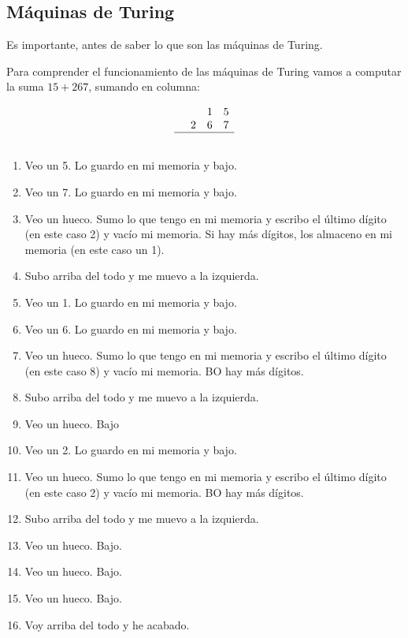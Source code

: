 
\subsection{Máquinas de Turing}

Es importante, antes de saber lo que son las máquinas de Turing.

\begin{example}
Para comprender el funcionamiento de las máquinas de Turing vamos a computar la suma $15 + 267$, sumando en columna:

\[
\begin{array}{cccc}
&&1&5\\
&2&6&7\\\hline
&&&
\end{array}
\]

\begin{enumerate}
	\item Veo un 5. Lo guardo en mi memoria y bajo.
	\item Veo un 7. Lo guardo en mi memoria y bajo.
	\item Veo un hueco. Sumo lo que tengo en mi memoria y escribo el último dígito (en este caso 2) y vacío mi memoria. Si hay más dígitos, los almaceno en mi memoria (en este caso un 1).
	\item Subo arriba del todo y me muevo a la izquierda.
	\item Veo un 1. Lo guardo en mi memoria y bajo.
	\item Veo un 6. Lo guardo en mi memoria y bajo.
	\item Veo un hueco. Sumo lo que tengo en mi memoria y escribo el último dígito (en este caso 8) y vacío mi memoria. BO hay más dígitos.
	\item Subo arriba del todo y me muevo a la izquierda.
	\item Veo un hueco. Bajo
	\item Veo un 2. Lo guardo en mi memoria y bajo.
	\item Veo un hueco. Sumo lo que tengo en mi memoria y escribo el último dígito (en este caso 2) y vacío mi memoria. BO hay más dígitos.
	\item Subo arriba del todo y me muevo a la izquierda.
	\item Veo un hueco. Bajo.
	\item Veo un hueco. Bajo.
	\item Veo un hueco. Bajo.
	\item Voy arriba del todo y he acabado.
\end{enumerate}
\end{example}

